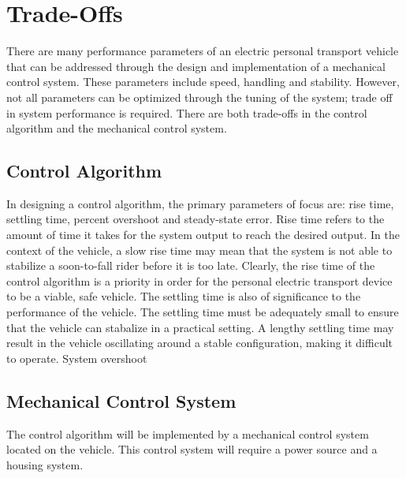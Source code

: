 \documentclass[12pt,letterpaper]{article}
\begin{document}
	
\section{Trade-Offs}
There are many performance parameters of an electric personal transport vehicle that can be addressed through the design and implementation of a mechanical control system. 
These parameters include speed, handling and stability. 
However, not all parameters can be optimized through the tuning of the system; trade off in system performance is required. 
There are both trade-offs in the control algorithm and the mechanical control system.

\subsection{Control Algorithm} 
In designing a control algorithm, the primary parameters of focus are: rise time, settling time, percent overshoot and steady-state error. 
Rise time refers to the amount of time it takes for the system output to reach the desired output. 
In the context of the vehicle, a slow rise time may mean that the system is not able to stabilize a soon-to-fall rider before it is too late. 
Clearly, the rise time of the control algorithm is a priority in order for the personal electric transport device to be a viable, safe vehicle.
The settling time is also of significance to the performance of the vehicle. 
The settling time must be adequately small to ensure that the vehicle can stabalize in a practical setting. 
A lengthy settling time may result in the vehicle oscillating around a stable configuration, making it difficult to operate. 
System overshoot 

\subsection{Mechanical Control System}
The control algorithm will be implemented by a mechanical control system located on the vehicle. 
This control system will require a power source and a housing system. 


\newpage
{}

\end{document}

